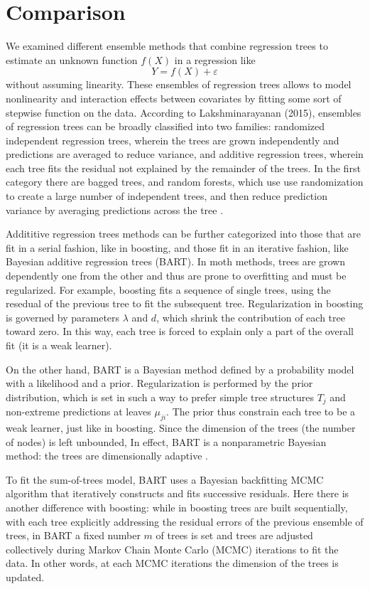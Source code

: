 \documentclass[a4paper,11pt]{article}
\begin{document}
\section{Comparison}
\label{Comparison}

We examined different ensemble methods that combine regression trees to estimate an unknown function $f(X)$ in a regression like 
\[
Y = f(X) + \varepsilon
\]
without assuming linearity.
These ensembles of regression trees allows to model nonlinearity and interaction effects between covariates by fitting some sort of stepwise function on the data. According to Lakshminarayanan (2015), ensembles of regression trees can be
broadly classified into two families: randomized independent regression trees, wherein the trees are grown independently and predictions are averaged to reduce variance, and additive regression trees, wherein each
tree fits the residual not explained by the remainder of
the trees. In the first category there are bagged trees, and random forests, which use use randomization to create a large number of independent trees, and then reduce prediction variance by averaging predictions across the tree \parencite{chipmanBARTBayesianAdditive2010}.

Addititive regression trees methods can be further categorized into those that are fit in a serial fashion, like in boosting, and those fit in an iterative fashion, like
Bayesian additive regression trees (BART). In moth methods, trees are grown dependently one from the other and thus are prone to overfitting and must be regularized. For example, boosting fits a sequence of single trees, using the resedual of the previous tree to fit the subsequent tree. Regularization in boosting is governed by parameters $\lambda$ and $d$, which shrink the contribution of each tree toward zero. In this way, each tree is forced to explain only a part of the overall fit (it is a weak learner). 

On the other hand, BART is a Bayesian method defined by a probability model with a likelihood and a prior. Regularization is performed by the prior distribution, which is set in such a way to prefer simple tree structures $T_j$ and non-extreme predictions at leaves $\mu_{ji}$. The prior thus constrain each tree to be a weak learner, just like in boosting. Since the dimension of the trees (the number of nodes) is left unbounded,  In effect, BART is a nonparametric Bayesian method: the trees are dimensionally adaptive \parencite{chipmanBARTBayesianAdditive2010}.

To fit the sum-of-trees model, BART uses a Bayesian backfitting MCMC algorithm that iteratively constructs and fits successive residuals. Here there is another difference with boosting: while in boosting trees are built sequentially, with each tree explicitly addressing the residual errors of the previous ensemble of trees, in BART a fixed number $m$ of trees is set and trees are adjusted collectively during Markov Chain Monte Carlo (MCMC) iterations to fit the data. In other words, at each MCMC iterations the dimension of the trees is updated.  
\end{document}
